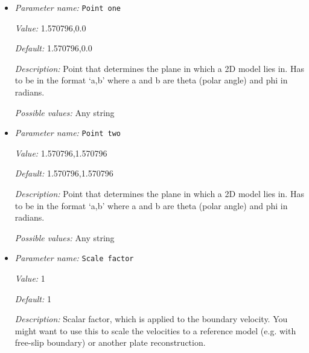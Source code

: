 \begin{itemize}
{\it Value:} 100000


{\it Default:} 100000


{\it Description:} Determines the depth of the lithosphere, so that the GPlates velocities can be applied at the sides of the model as well as at the surface.


{\it Possible values:} A floating point number $v$ such that $0 \leq v \leq \text{MAX\_DOUBLE}$
\item {\it Parameter name:} {\tt Point one}
\label{parameters:Boundary velocity model/GPlates model/Point one}
\label{parameters:Boundary_20velocity_20model/GPlates_20model/Point_20one}


{\it Value:} 1.570796,0.0


{\it Default:} 1.570796,0.0


{\it Description:} Point that determines the plane in which a 2D model lies in. Has to be in the format `a,b' where a and b are theta (polar angle)  and phi in radians.


{\it Possible values:} Any string
\item {\it Parameter name:} {\tt Point two}
\label{parameters:Boundary velocity model/GPlates model/Point two}
\label{parameters:Boundary_20velocity_20model/GPlates_20model/Point_20two}


{\it Value:} 1.570796,1.570796


{\it Default:} 1.570796,1.570796


{\it Description:} Point that determines the plane in which a 2D model lies in. Has to be in the format `a,b' where a and b are theta (polar angle)  and phi in radians.


{\it Possible values:} Any string
\item {\it Parameter name:} {\tt Scale factor}
\label{parameters:Boundary velocity model/GPlates model/Scale factor}
\label{parameters:Boundary_20velocity_20model/GPlates_20model/Scale_20factor}


{\it Value:} 1


{\it Default:} 1


{\it Description:} Scalar factor, which is applied to the boundary velocity. You might want to use this to scale the velocities to a reference model (e.g. with free-slip boundary) or another plate reconstruction.



\end{itemize}

